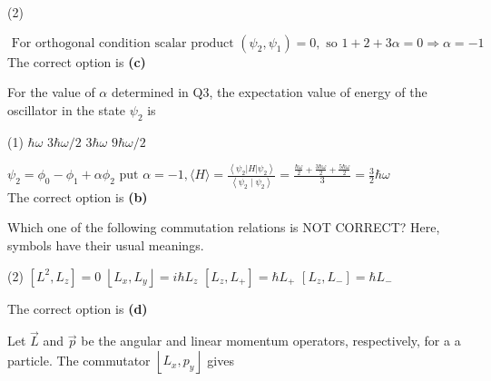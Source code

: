 \begin{enumerate}
\begin{minipage}{\textwidth}
\end{minipage}
\begin{tasks}(2)
\end{tasks}
\begin{answer}
	$\text { For orthogonal condition scalar product }\left(\psi_{2}, \psi_{1}\right)=0, \text { so } 1+2+3 \alpha=0 \Rightarrow \alpha=-1$\\
	The correct option is \textbf{(c)}
\end{answer}
\begin{minipage}{\textwidth}
	\item For the value of $\alpha$ determined in $\mathrm{Q} 3$, the expectation value of energy of the oscillator in the state $\psi_{2}$ is
\end{minipage}
\begin{tasks}(1)
	\task[\textbf{A.}] $\hbar \omega$
	\task[\textbf{B.}]$3 \hbar \omega / 2$ 
	\task[\textbf{C.}]$3 \hbar \omega$
	\task[\textbf{D.}]$9 \hbar \omega / 2$
\end{tasks}
\begin{answer}
	$\psi_{2}=\phi_{0}-\phi_{1}+\alpha \phi_{2} \text { put } \alpha=-1,\langle H\rangle=\frac{\left\langle\psi_{2}|H| \psi_{2}\right\rangle}{\left\langle\psi_{2} \mid \psi_{2}\right\rangle}=\frac{\frac{\hbar \omega}{2}+\frac{3 \hbar \omega}{2}+\frac{5 \hbar \omega}{2}}{3}=\frac{3}{2} \hbar \omega$\\
	The correct option is \textbf{(b)}
\end{answer}
\begin{minipage}{\textwidth}
	\item Which one of the following commutation relations is NOT CORRECT? Here, symbols have their usual meanings.
\end{minipage}
\begin{tasks}(2)
	\task[\textbf{A.}] $\left[L^{2}, L_{z}\right]=0$
	\task[\textbf{B.}]$\left\lfloor L_{x}, L_{y}\right\rfloor=i \hbar L_{z}$
	\task[\textbf{C.}]$\left[L_{z}, L_{+}\right]=\hbar L_{+}$
	\task[\textbf{D.}] $\left[L_{z}, L_{-}\right]=\hbar L_{-}$
\end{tasks}
\begin{answer}
	The correct option is \textbf{(d)}
\end{answer}
\begin{minipage}{\textwidth}
	\item Let $\vec{L}$ and $\vec{p}$ be the angular and linear momentum operators, respectively, for a a particle. The commutator $\left\lfloor L_{x}, p_{y}\right\rfloor$ gives

\end{minipage}
\end{enumerate}
